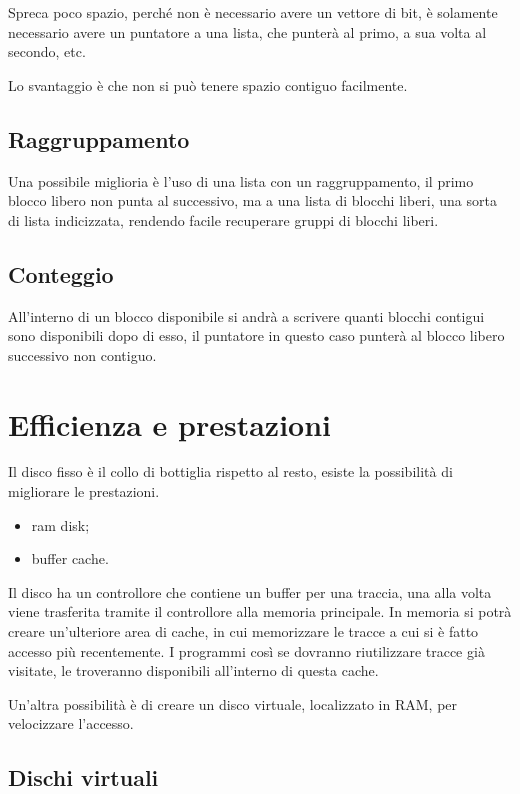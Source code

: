 \documentclass[a4paper, 12pt]{book}
\begin{document}
Spreca poco spazio, perché non è necessario avere 
un vettore di bit, è solamente necessario avere un 
puntatore a una lista, che punterà al primo, a sua volta 
al secondo, etc. 

Lo svantaggio è che non si può tenere spazio contiguo 
facilmente. 

\subsection{Raggruppamento}

Una possibile miglioria è l'uso di una lista con un 
raggruppamento, il primo blocco libero non punta 
al successivo, ma a una lista di blocchi liberi, una sorta 
di lista indicizzata, rendendo facile recuperare gruppi 
di blocchi liberi.

\subsection{Conteggio}

All'interno di un blocco disponibile si andrà a scrivere 
quanti blocchi contigui sono disponibili dopo di esso, 
il puntatore in questo caso punterà al blocco libero
successivo non contiguo.

\section{Efficienza e prestazioni}

Il disco fisso è il collo di bottiglia rispetto al resto, 
esiste la possibilità di migliorare le prestazioni.
\begin{itemize}
    \item ram disk;
    \item buffer cache.
\end{itemize}
Il disco ha un controllore che contiene un buffer per una 
traccia, una alla volta viene trasferita tramite il controllore 
alla memoria principale. In memoria si potrà creare un'ulteriore 
area di cache, in cui memorizzare le tracce a cui si è fatto 
accesso più recentemente. I programmi così se dovranno 
riutilizzare tracce già visitate, le troveranno disponibili
all'interno di questa cache. 

Un'altra possibilità è di creare un disco virtuale, localizzato 
in RAM, per velocizzare l'accesso.

\subsection{Dischi virtuali}
\end{document}
